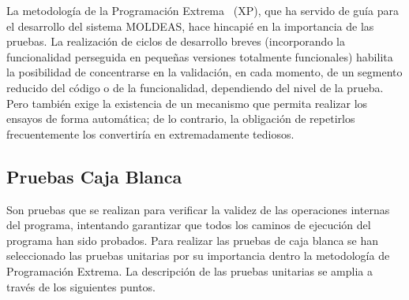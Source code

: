 La metodología de la Programación Extrema~\cite{XP} (\gls{XP}), que ha servido de guía para el desarrollo 
del sistema MOLDEAS, hace hincapié en la importancia de las pruebas. La realización de ciclos de desarrollo breves
(incorporando la funcionalidad perseguida en pequeñas versiones totalmente funcionales) habilita la posibilidad de 
concentrarse en la validación, en cada momento, de un segmento reducido del código o de la funcionalidad, 
dependiendo del nivel de la prueba. Pero también exige la existencia de un mecanismo que permita 
realizar los ensayos de forma automática; de lo contrario, la obligación de repetirlos 
frecuentemente los convertiría en extremadamente tediosos.

\subsection{Pruebas Caja Blanca}
Son pruebas que se realizan para verificar la validez de las operaciones internas del programa, 
intentando garantizar que todos los caminos de ejecución del programa han sido probados. Para realizar las pruebas de caja blanca se han 
seleccionado las pruebas unitarias por su importancia dentro la metodología de Programación Extrema. 
La descripción de las pruebas unitarias se amplia a través de los siguientes puntos.


